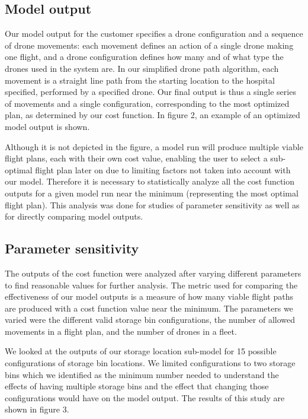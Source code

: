 \documentclass[twocolumn,10pt]{asme2ej}
\begin{document}
\subsection{Model output}
Our model output for the customer specifies a drone configuration and a sequence of drone movements: each movement defines an action of a single drone making one flight, and a drone configuration defines how many and of what type the drones used in the system are. In our simplified drone path algorithm, each movement is a straight line path from the starting location to the hospital specified, performed by a specified drone. Our final output is thus a single series of movements and a single configuration, corresponding to the most optimized plan, as determined by our cost function. In figure 2, an example of an optimized model output is shown. 

Although it is not depicted in the figure, a model run will produce multiple viable flight plans, each with their own cost value, enabling the user to select a sub-optimal flight plan later on due to limiting factors not taken into account with our model. Therefore it is necessary to statistically analyze all the cost function outputs for a given model run near the minimum (representing the most optimal flight plan). This analysis was done for studies of parameter sensitivity as well as for directly comparing model outputs.

\subsection{Parameter sensitivity}
The outputs of the cost function were analyzed after varying different parameters to find reasonable values for further analysis. The metric used for comparing the effectiveness of our model outputs is a measure of how many viable flight paths are produced with a cost function value near the minimum. The parameters we varied were the different valid storage bin configurations, the number of allowed movements in a flight plan, and the number of drones in a fleet.

We looked at the outputs of our storage location sub-model for 15 possible configurations of storage bin locations. We limited configurations to two storage bins which we identified as the minimum number needed to understand the effects of having multiple storage bins and the effect that changing those configurations would have on the model output. The results of this study are shown in figure 3.
\end{document}
